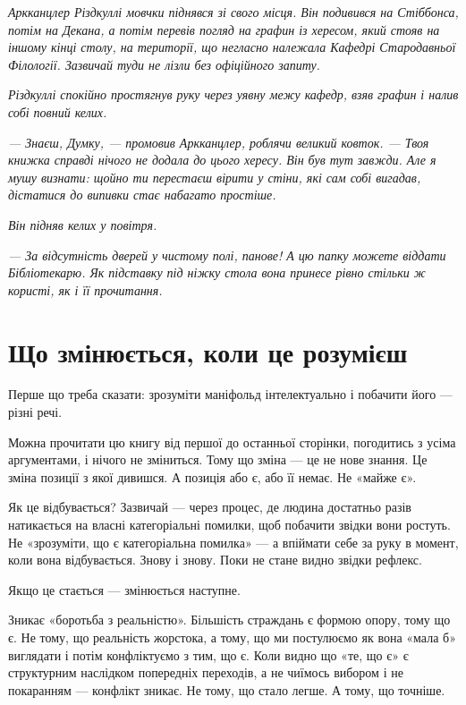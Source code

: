 \documentclass[12pt, a4paper, openany]{book}
\begin{document}
\begin{terrybox}
\textit{Аркканцлер Різдкуллі мовчки піднявся зі свого місця. Він подивився на Стіббонса, потім на Декана, а потім перевів погляд на графин із хересом, який стояв на іншому кінці столу, на території, що негласно належала Кафедрі Стародавньої Філології. Зазвичай туди не лізли без офіційного запиту.}

\textit{Різдкуллі спокійно простягнув руку через уявну межу кафедр, взяв графин і налив собі повний келих.}

\textit{--- Знаєш, Думку, --- промовив Аркканцлер, роблячи великий ковток. --- Твоя книжка справді нічого не додала до цього хересу. Він був тут завжди. Але я мушу визнати: щойно ти перестаєш вірити у стіни, які сам собі вигадав, дістатися до випивки стає набагато простіше.}

\textit{Він підняв келих у повітря.}

\textit{--- За відсутність дверей у чистому полі, панове! А цю папку можете віддати Бібліотекарю. Як підставку під ніжку стола вона принесе рівно стільки ж користі, як і її прочитання.}
\end{terrybox}


\chapter{Що змінюється, коли це розумієш}

Перше що треба сказати: зрозуміти маніфольд інтелектуально і побачити його — різні речі.

Можна прочитати цю книгу від першої до останньої сторінки, погодитись з усіма аргументами, і нічого не зміниться. Тому що зміна — це не нове знання. Це зміна позиції з якої дивишся. А позиція або є, або її немає. Не «майже є».

Як це відбувається? Зазвичай — через процес, де людина достатньо разів натикається на власні категоріальні помилки, щоб побачити звідки вони ростуть. Не «зрозуміти, що є категоріальна помилка» — а впіймати себе за руку в момент, коли вона відбувається. Знову і знову. Поки не стане видно звідки рефлекс.

Якщо це стається — змінюється наступне.

Зникає «боротьба з реальністю». Більшість страждань є формою опору, тому що є. Не тому, що реальність жорстока, а тому, що ми постулюємо як вона «мала б» виглядати і потім конфліктуємо з тим, що є. Коли видно що «те, що є» є структурним наслідком попередніх переходів, а не чиїмось вибором і не покаранням — конфлікт зникає. Не тому, що стало легше. А тому, що точніше.
\end{document}
